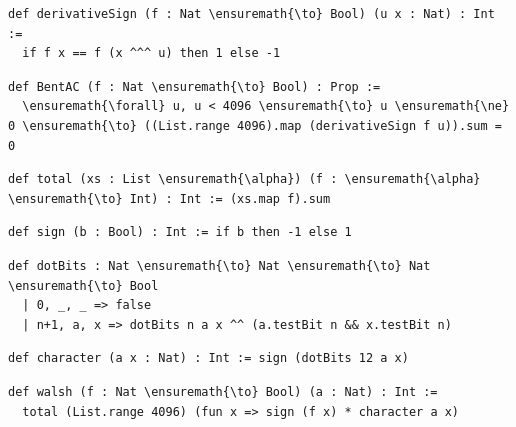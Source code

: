 \documentclass[pdflatex,sn-mathphys-num]{sn-jnl}
\begin{document}
\begin{Verbatim}[fontsize=\scriptsize,breaklines=true,breakanywhere=true,commandchars=\\\{\}]
def derivativeSign (f : Nat \ensuremath{\to} Bool) (u x : Nat) : Int :=
  if f x == f (x ^^^ u) then 1 else -1
\end{Verbatim}

\begin{Verbatim}[fontsize=\scriptsize,breaklines=true,breakanywhere=true,commandchars=\\\{\}]
def BentAC (f : Nat \ensuremath{\to} Bool) : Prop :=
  \ensuremath{\forall} u, u < 4096 \ensuremath{\to} u \ensuremath{\ne} 0 \ensuremath{\to} ((List.range 4096).map (derivativeSign f u)).sum = 0
\end{Verbatim}

\begin{Verbatim}[fontsize=\scriptsize,breaklines=true,breakanywhere=true,commandchars=\\\{\}]
def total (xs : List \ensuremath{\alpha}) (f : \ensuremath{\alpha} \ensuremath{\to} Int) : Int := (xs.map f).sum
\end{Verbatim}

\begin{Verbatim}[fontsize=\scriptsize,breaklines=true,breakanywhere=true,commandchars=\\\{\}]
def sign (b : Bool) : Int := if b then -1 else 1
\end{Verbatim}

\begin{Verbatim}[fontsize=\scriptsize,breaklines=true,breakanywhere=true,commandchars=\\\{\}]
def dotBits : Nat \ensuremath{\to} Nat \ensuremath{\to} Nat \ensuremath{\to} Bool
  | 0, _, _ => false
  | n+1, a, x => dotBits n a x ^^ (a.testBit n && x.testBit n)
\end{Verbatim}

\begin{Verbatim}[fontsize=\scriptsize,breaklines=true,breakanywhere=true,commandchars=\\\{\}]
def character (a x : Nat) : Int := sign (dotBits 12 a x)
\end{Verbatim}

\begin{Verbatim}[fontsize=\scriptsize,breaklines=true,breakanywhere=true,commandchars=\\\{\}]
def walsh (f : Nat \ensuremath{\to} Bool) (a : Nat) : Int :=
  total (List.range 4096) (fun x => sign (f x) * character a x)
\end{Verbatim}
\end{document}
